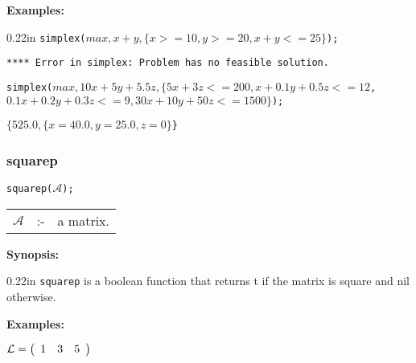 {\bf Examples:}

\begin{addtolength}{\leftskip}{0.22in}
{\tt simplex($max,x+y,\{x>=10,y>=20,x+y<=25\}$);}

{\tt ***** Error in simplex: Problem has no feasible solution.}

\vspace*{0.2in}

\parbox[t]{0.96\linewidth}{\tt simplex($max,10x+5y+5.5z,\{5x+3z<=200,
x+0.1y+0.5z<=12$,\\
\hspace*{0.55in} $0.1x+0.2y+0.3z<=9, 30x+10y+50z<=1500\}$);}

\vspace*{0.1in}
{\tt $\{525.0,\{x=40.0,y=25.0,z=0\}$\}}

\end{addtolength}


\subsubsection{squarep}
\label{linalg:squarep}


\hspace*{0.175in} {\tt squarep($\mathcal{A}$);}

\hspace*{0.1in}  
\begin{tabular}{l l l} 
$\mathcal{A}$ &:-& a matrix.
\end{tabular}

{\bf Synopsis:} %

\begin{addtolength}{\leftskip}{0.22in}
{\tt squarep} is a boolean function that returns t if 
                the matrix is square and nil otherwise.

\end{addtolength}

{\bf Examples:}

\begin{flushleft}
\hspace*{0.175in}
\begin{math}  
{\cal L} = \left( \begin{array}{ccc} 1 & 3 & 5 
\end{array} \right)
\end{math}  
\end{flushleft}

